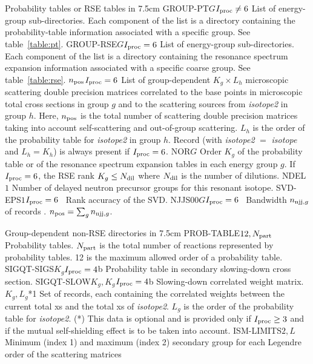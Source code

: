 \begin{DescriptionEnregistrement}{Probability tables or RSE tables in }{7.5cm}
\OptDirlEnr
  {GROUP-PT}{$G$}{$I_{\rm proc}\ne 6$}
  {List of energy-group sub-directories. Each component of the list is a directory containing
  the probability-table information associated with a specific group. See table~\ref{table:pt}.}
\OptDirlEnr
  {GROUP-RSE}{$G$}{$I_{\rm proc}= 6$}
  {List of energy-group sub-directories. Each component of the list is a directory containing
  the resonance spectrum expansion information associated with a specific coarse group. See table~\ref{table:rse}.}
\OptDirlEnr
  {}{$n_{\rm pos}$}{$I_{\rm proc}= 6$}
  {List of group-dependent $K_g \times L_h$ microscopic scattering double precision matrices correlated to the base points in microscopic total cross sections in group $g$ and to
  the scattering sources from {\sl isotope2} in group $h$. Here, $n_{\rm pos}$ is the total number of scattering double precision matrices taking into account self-scattering and out-of-group scattering.
  $L_h$ is the order of the probability table for {\sl isotope2} in group $h$. Record  (with {\sl isotope2} $=$ {\sl isotope} and $L_h=K_h$) is always present if $I_{\rm proc}= 6$.}
\IntEnr
  {NOR}{$G$}
  {Order $K_g$ of the probability table or of the resonance spectrum expansion tables in each energy group $g$.
  If $I_{\rm proc}= 6$, the RSE rank $K_g \le N_{\rm dil}$ where $N_{\rm dil}$ is the number of dilutions.}
\IntEnr
  {NDEL}{$1$}
  {Number of delayed neutron precursor groups for this resonant isotope.}
\OptRealEnr
  {SVD-EPS}{$1$}{$I_{\rm proc}= 6$}{~}
  {Rank accuracy of the SVD.}
\OptRealEnr
  {NJJS00}{$G$}{$I_{\rm proc}= 6$}{~}
  {Bandwidth $n_{{\rm njj},g}$ of records . $n_{\rm pos}=\sum_g n_{{\rm njj},g}$.}
\end{DescriptionEnregistrement}

\vskip -0.3cm

\begin{DescriptionEnregistrement}{Group-dependent non-RSE directories in }{7.5cm}\label{table:pt}
\RealEnr
  {PROB-TABLE}{$12,N_{\rm part}$}{~}
  {Probability tables. $N_{\rm part}$ is the total number of reactions
   represented by probability tables. 12 is the maximum allowed order of a
   probability table.}
\OptRealEnr
  {SIGQT-SIGS}{$K_g$}{$I_{\rm proc}=4$}{b}
  {Probability table in secondary slowing-down cross section.}
\OptRealEnr
  {SIGQT-SLOW}{$K_g,K_g$}{$I_{\rm proc}=4$}{b}
  {Slowing-down correlated weight matrix.}
\OptRealVar
  {}{$K_g,L_g$}{*}{1}
  {Set of records, each containing the correlated weights
  between the current total xs and the total xs of {\sl isotope2}. $L_g$ is the
  order of the probability table for {\sl isotope2}. (*) This data is optional
  and is provided only if $I_{\rm proc}\ge 3$ and if the mutual self-shielding
  effect is to be taken into account.}
\IntEnr
  {ISM-LIMITS}{$2,L$}
  {Minimum (index 1) and maximum (index 2) secondary group for each Legendre
   order of the scattering matrices}
\end{DescriptionEnregistrement}

